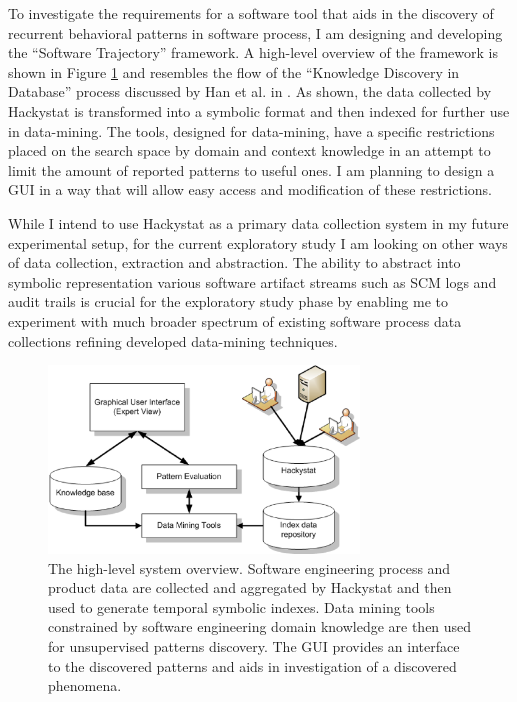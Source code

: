 \documentclass{sig-alternate}
\begin{document}
To investigate the requirements for a software tool that aids in the discovery of recurrent behavioral patterns in software process, I am designing and developing the ``Software Trajectory'' framework. A high-level overview of the framework is shown in Figure \ref{fig:system_overview} and resembles the flow of the ``Knowledge Discovery in Database'' process discussed by Han et al. in \cite{citeulike:709476}. As shown, the data collected by Hackystat is transformed into a symbolic format and then indexed for further use in data-mining. The tools, designed for data-mining, have a specific restrictions placed on the search space by domain and context knowledge in an attempt to limit the amount of reported patterns to useful ones. I am planning to design a GUI in a way that will allow easy access and modification of these restrictions. 

While I intend to use Hackystat as a primary data collection system in my future experimental setup, for the current exploratory study I am looking on other ways of data collection, extraction and abstraction. The ability to abstract into symbolic representation various software artifact streams such as SCM logs and audit trails is crucial for the exploratory study phase by enabling me to experiment with much broader spectrum of existing software process data collections refining developed data-mining techniques.

\begin{figure}[tbp]
   \centering
   \includegraphics[height=50mm]{system_overview.eps}
   \caption{The high-level system overview. Software engineering process and product data are collected and aggregated by Hackystat and then used to generate temporal symbolic indexes. Data mining tools constrained by software engineering domain knowledge are then used for unsupervised patterns discovery. The GUI provides an interface to the discovered patterns and aids in investigation of a discovered phenomena.}
   \label{fig:system_overview}
\end{figure}
 
\end{document}
